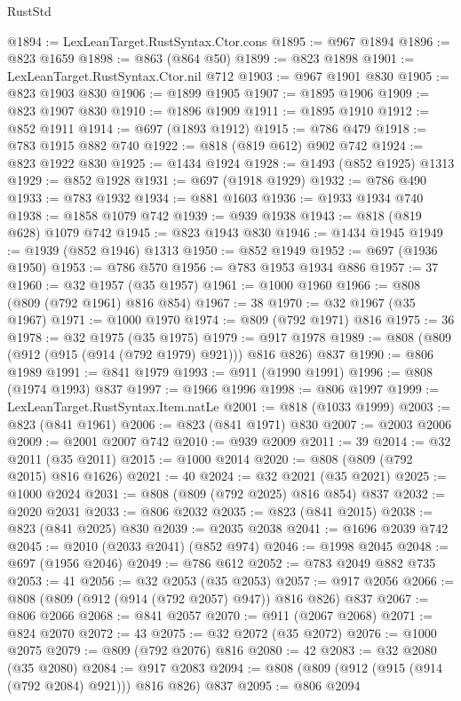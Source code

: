 \begin{lexlean}{RustStd}
\begin{coremodule}
@1894 := LexLeanTarget.RustSyntax.Ctor.cons
@1895 := @967 @1894
@1896 := @823 @1659
@1898 := @863 (@864 @50)
@1899 := @823 @1898
@1901 := LexLeanTarget.RustSyntax.Ctor.nil @712
@1903 := @967 @1901 @830
@1905 := @823 @1903 @830
@1906 := @1899 @1905
@1907 := @1895 @1906
@1909 := @823 @1907 @830
@1910 := @1896 @1909
@1911 := @1895 @1910
@1912 := @852 @1911
@1914 := @697 (@1893 @1912)
@1915 := @786 @479
@1918 := @783 @1915 @882 @740
@1922 := @818 (@819 @612) @902 @742
@1924 := @823 @1922 @830
@1925 := @1434 @1924
@1928 := @1493 (@852 @1925) @1313
@1929 := @852 @1928
@1931 := @697 (@1918 @1929)
@1932 := @786 @490
@1933 := @783 @1932
@1934 := @881 @1603
@1936 := @1933 @1934 @740
@1938 := @1858 @1079 @742
@1939 := @939 @1938
@1943 := @818 (@819 @628) @1079 @742
@1945 := @823 @1943 @830
@1946 := @1434 @1945
@1949 := @1939 (@852 @1946) @1313
@1950 := @852 @1949
@1952 := @697 (@1936 @1950)
@1953 := @786 @570
@1956 := @783 @1953 @1934 @886
@1957 := 37
@1960 := @32 @1957 (@35 @1957)
@1961 := @1000 @1960
@1966 := @808 (@809 (@792 @1961) @816 @854)
@1967 := 38
@1970 := @32 @1967 (@35 @1967)
@1971 := @1000 @1970
@1974 := @809 (@792 @1971) @816
@1975 := 36
@1978 := @32 @1975 (@35 @1975)
@1979 := @917 @1978
@1989 := @808 (@809 (@912 (@915 (@914 (@792 @1979) @921))) @816 @826) @837
@1990 := @806 @1989
@1991 := @841 @1979
@1993 := @911 (@1990 @1991)
@1996 := @808 (@1974 @1993) @837
@1997 := @1966 @1996
@1998 := @806 @1997
@1999 := LexLeanTarget.RustSyntax.Item.natLe
@2001 := @818 (@1033 @1999)
@2003 := @823 (@841 @1961)
@2006 := @823 (@841 @1971) @830
@2007 := @2003 @2006
@2009 := @2001 @2007 @742
@2010 := @939 @2009
@2011 := 39
@2014 := @32 @2011 (@35 @2011)
@2015 := @1000 @2014
@2020 := @808 (@809 (@792 @2015) @816 @1626)
@2021 := 40
@2024 := @32 @2021 (@35 @2021)
@2025 := @1000 @2024
@2031 := @808 (@809 (@792 @2025) @816 @854) @837
@2032 := @2020 @2031
@2033 := @806 @2032
@2035 := @823 (@841 @2015)
@2038 := @823 (@841 @2025) @830
@2039 := @2035 @2038
@2041 := @1696 @2039 @742
@2045 := @2010 (@2033 @2041) (@852 @974)
@2046 := @1998 @2045
@2048 := @697 (@1956 @2046)
@2049 := @786 @612
@2052 := @783 @2049 @882 @735
@2053 := 41
@2056 := @32 @2053 (@35 @2053)
@2057 := @917 @2056
@2066 := @808 (@809 (@912 (@914 (@792 @2057) @947)) @816 @826) @837
@2067 := @806 @2066
@2068 := @841 @2057
@2070 := @911 (@2067 @2068)
@2071 := @824 @2070
@2072 := 43
@2075 := @32 @2072 (@35 @2072)
@2076 := @1000 @2075
@2079 := @809 (@792 @2076) @816
@2080 := 42
@2083 := @32 @2080 (@35 @2080)
@2084 := @917 @2083
@2094 := @808 (@809 (@912 (@915 (@914 (@792 @2084) @921))) @816 @826) @837
@2095 := @806 @2094

\end{coremodule}
\end{lexlean}
